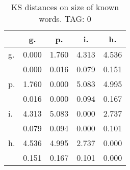\begin{table}[h!]
\begin{center}
\begin{tabular}{| l | c | c | c | c |}\hline
 & g. & p. & i. & h. \\\hline
g. & 0.000  & 1.760  & 4.313  & 4.536 \\\hline
 & 0.000  & 0.016  & 0.079  & 0.151 \\\hline
p. & 1.760  & 0.000  & 5.083  & 4.995 \\\hline
 & 0.016  & 0.000  & 0.094  & 0.167 \\\hline
i. & 4.313  & 5.083  & 0.000  & 2.737 \\\hline
 & 0.079  & 0.094  & 0.000  & 0.101 \\\hline
h. & 4.536  & 4.995  & 2.737  & 0.000 \\\hline
 & 0.151  & 0.167  & 0.101  & 0.000 \\\hline
\end{tabular}
\caption{KS distances on size of known words. TAG: 0}
\end{center}
\end{table}
